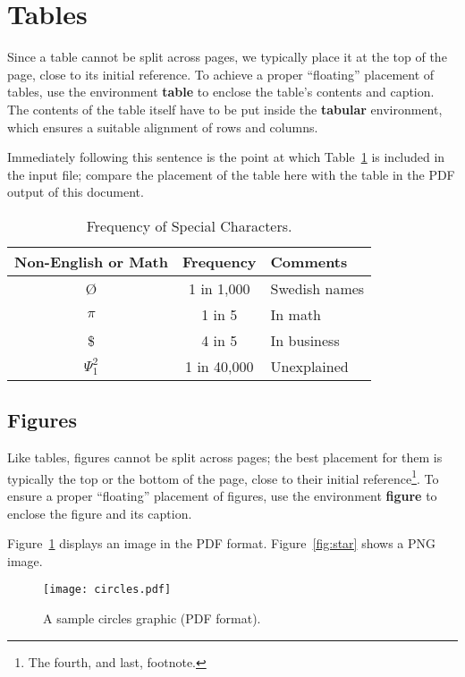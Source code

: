 \section{Tables}\label{sec:Format_Tables}

Since a table cannot be split across pages, we typically place it at the top of the page, close to its initial reference.
To achieve a proper ``floating'' placement of tables, use the environment \textbf{table} to enclose the table's contents and caption. 
The contents of the table itself have to be put inside the \textbf{tabular} environment, which ensures a suitable alignment of rows and columns.

Immediately following this sentence is the point at which Table~\ref{tab:table1} is included in the input file; compare the placement of the table here with the table in the PDF output of this document.

\begin{table}[h]
    \centering
    \caption{Frequency of Special Characters.}
    \label{tab:table1}
    \begin{tabular}{ccl}
        \toprule
        Non-English or Math&Frequency&Comments\\
        \midrule
        \O & 1 in 1,000& Swedish names\\
        $\pi$ & 1 in 5& In math\\ 
        \$ & 4 in 5 & In business\\ 
        $\Psi^2_1$ & 1 in 40,000& Unexplained\\
        \bottomrule
    \end{tabular}
\end{table}

\subsection{Figures}

Like tables, figures cannot be split across pages; the best placement for them is typically the top or the bottom of the page, close to their initial reference\footnote{The fourth, and last, footnote.}.
To ensure a proper ``floating'' placement of figures, use the environment \textbf{figure} to enclose the figure and its caption.

Figure~\ref{fig:circles} displays an image in the PDF format.
Figure~\ref{fig:star} shows a PNG image.

\begin{figure}
    \centering
    \texttt{[image: circles.pdf]}
    \caption{A sample circles graphic (PDF format).}
    \label{fig:circles}
\end{figure}

